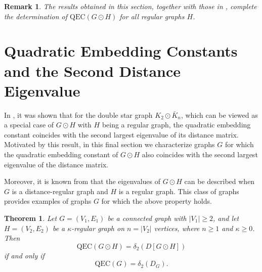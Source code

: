 \documentclass[pdflatex,sn-mathphys-num]{sn-jnl}
\theoremstyle{thmstyleone}%
\newtheorem{theorem}{Theorem}%
\theoremstyle{thmstyletwo}%
\newtheorem{remark}{Remark}%
\theoremstyle{thmstylethree}%
\begin{document}
\begin{remark}\normalfont
The results obtained in this section, together with those in 
\cite{Ferdi-Baskoro-Obata-Santika2025}, complete the determination of 
$\mathrm{QEC}(G\odot H)$ for all regular graphs $H$.
\end{remark}


\section{Quadratic Embedding Constants and the Second Distance Eigenvalue}

In \cite{Choudhury-Nandi2023}, it was shown that for the double star graph 
$K_2\odot \bar{K}_n$, which can be viewed as a special case of $G\odot H$ 
with $H$ being a regular graph, the quadratic embedding constant coincides 
with the second largest eigenvalue of its distance matrix. Motivated by this result, 
in this final section we characterize graphs $G$ for which the quadratic embedding 
constant of $G\odot H$ also coincides with the second largest eigenvalue of the 
distance matrix.

Moreover, it is known from \cite{Indulal-Stevanovic2015, Lin-Shu-Xue-Zhang2021} that 
the eigenvalues of $G\odot H$ can be described when $G$ is a distance-regular graph 
and $H$ is a regular graph. This class of graphs provides examples of graphs $G$ 
for which the above property holds.  

\begin{theorem}
Let $G=(V_1,E_1)$ be a connected graph with $|V_1|\ge 2$, and let 
$H=(V_2,E_2)$ be a $\kappa$-regular graph on $n=|V_2|$ vertices, where $n\geq 1$ and $\kappa\geq 0$. Then
\[
\mathrm{QEC}(G\odot H)=\delta_2(D[G\odot H])
\]
if and only if
\[
\mathrm{QEC}(G)=\delta_2(D_G).
\]
\end{theorem}
\end{document}
